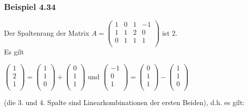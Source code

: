 \documentclass{article}
\begin{document}
\subsubsection*{Beispiel 4.34}
Der Spaltenrang der Matrix $A = \begin{pmatrix}
    1 & 0 & 1 & -1 \\
    1 & 1 & 2 & 0 \\
    0 & 1 & 1 & 1 \\
\end{pmatrix}$ ist 2. \\
Es gilt 
\begin{center}
$\begin{pmatrix}
    1 \\
    2 \\
    1 \\
\end{pmatrix} = \begin{pmatrix}
    1 \\
    1 \\
    0 \\
\end{pmatrix} + \begin{pmatrix}
    0 \\
    1 \\
    1 \\
\end{pmatrix}$ und $\begin{pmatrix}
    -1 \\
    0 \\
    1 \\
\end{pmatrix} = \begin{pmatrix}
    0 \\
    1 \\
    1 \\
\end{pmatrix} - \begin{pmatrix}
    1 \\
    1 \\
    0 \\
\end{pmatrix}$ 
\end{center}
(die 3. und 4. Spalte sind Linearkombinationen der ersten Beiden), d.h. es gilt: \\
\end{document}
